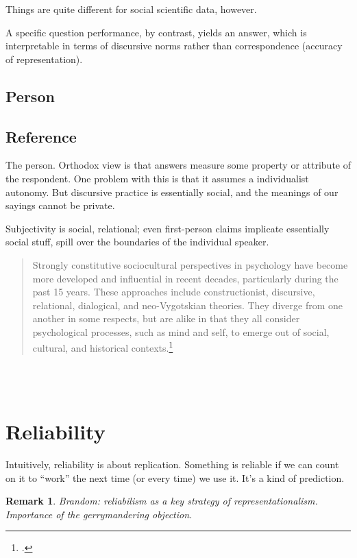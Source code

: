 \documentclass[11pt,twoside]{article}
\newtheorem{remark}{Remark}
\begin{document}
Things are quite different for social scientific data, however.

A specific question performance, by contrast, yields an answer, which
is interpretable in terms of discursive norms rather than
correspondence (accuracy of representation).

\subsection{Person}

\subsection{Reference}

The person.  Orthodox view is that answers measure some property or
attribute of the respondent.  One problem with this is that it assumes
a individualist autonomy.  But discursive practice is essentially
social, and the meanings of our sayings cannot be private.

Subjectivity is social, relational; even first-person claims implicate
essentially social stuff, spill over the boundaries of the individual
speaker.

\blockquote{Strongly constitutive sociocultural perspectives in
  psychology have become more developed and influential in recent
  decades, particularly during the past 15 years. These approaches
  include constructionist, discursive, relational, dialogical, and
  neo-Vygotskian theories. They diverge from one another in some
  respects, but are alike in that they all consider psychological
  processes, such as mind and self, to emerge out of social, cultural,
  and historical contexts.\footcite{kirschner_sociocultural_2010}}

\noindent
\cite{bucholtz_identity_2005}\\
\cite{kirschner_sociocultural_2010}\\
\cite{andreouli_identity_2010}

\section{Reliability}

Intuitively, reliability is about replication.  Something is reliable
if we can count on it to \enquote{work} the next time (or every time)
we use it.  It's a kind of prediction.

\begin{remark}
Brandom: reliabilism as a key strategy of representationalism.
Importance of the gerrymandering objection.
\end{remark}
\end{document}

